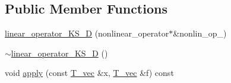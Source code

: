 \subsection*{Public Member Functions}
\begin{DoxyCompactItemize}
\item 
\hyperlink{classnonlinear__operators_1_1linear__operator__KS__2D_aa66facf77f299cf2b1cc46d981fcd798}{linear\-\_\-operator\-\_\-\-K\-S\-\_\-D} (nonlinear\-\_\-operator$\ast$\&nonlin\-\_\-op\-\_\-)
\item 
\hyperlink{classnonlinear__operators_1_1linear__operator__KS__2D_a458965ab332e9beaec6b9651d484f62a}{$\sim$linear\-\_\-operator\-\_\-\-K\-S\-\_\-D} ()
\item 
void \hyperlink{classnonlinear__operators_1_1linear__operator__KS__2D_a0590604314297c5c80922391e21ebdf0}{apply} (const \hyperlink{classnonlinear__operators_1_1linear__operator__KS__2D_af68ec3eba6ca7f10f49f64b20a7259a1}{T\-\_\-vec} \&x, \hyperlink{classnonlinear__operators_1_1linear__operator__KS__2D_af68ec3eba6ca7f10f49f64b20a7259a1}{T\-\_\-vec} \&f) const 
\end{DoxyCompactItemize}


